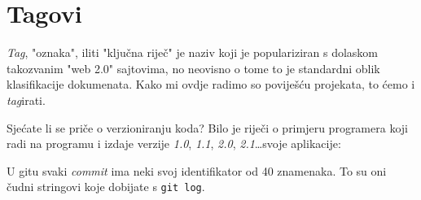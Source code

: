 \chapter*{Tagovi}

\emph{Tag}, "oznaka", iliti "ključna riječ" je naziv koji je populariziran s dolaskom takozvanim "web 2.0" sajtovima, no neovisno o tome to je standardni oblik klasifikacije dokumenata.
Kako mi ovdje radimo so poviješću projekata, to ćemo i \emph{tag}irati.

Sjećate li se priče o verzioniranju koda?
Bilo je riječi o primjeru programera koji radi na programu i izdaje verzije \emph{1.0}, \emph{1.1}, \emph{2.0}, \emph{2.1}\dots svoje aplikacije:



U gitu svaki \emph{commit} ima neki svoj identifikator od 40 znamenaka. 
To su oni čudni stringovi koje dobijate s \verb+git log+.

